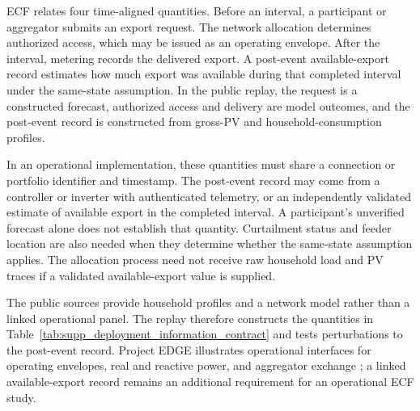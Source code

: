 \documentclass[11pt]{article}
\begin{document}
ECF relates four time-aligned quantities. Before an interval, a participant or
aggregator submits an export request. The network allocation determines
authorized access, which may be issued as an operating envelope. After the
interval, metering records the delivered export. A post-event available-export
record estimates how much export was available during that completed interval
under the same-state assumption. In the public replay, the request is a
constructed forecast, authorized access and delivery are model outcomes, and the
post-event record is constructed from gross-PV and household-consumption
profiles.

In an operational implementation, these quantities must share a connection or
portfolio identifier and timestamp. The post-event record may come from a
controller or inverter with authenticated telemetry, or an independently
validated estimate of available export in the completed interval. A
participant's unverified forecast alone does not establish that quantity. Curtailment
status and feeder location are also needed when they determine whether the
same-state assumption applies. The allocation process need not receive raw
household load and PV traces if a validated available-export value is supplied.

The public sources provide household profiles and a network model rather than a
linked operational panel. The replay therefore constructs the quantities in
Table~\ref{tab:supp_deployment_information_contract} and tests perturbations to
the post-event record. Project EDGE illustrates operational interfaces for
operating envelopes, real and reactive power, and aggregator exchange
\cite{aemo2023edgedataspec}; a linked available-export record remains an
additional requirement for an operational ECF study.
\end{document}
